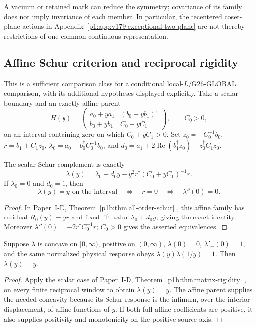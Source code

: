\documentclass[11pt,a4paper]{article}
\begin{document}
A vacuum or retained mark can reduce the symmetry; covariance of its
family does not imply invariance of each member.  In particular, the
recentered coset-plane actions in
Appendix~\ref{p1:app:v179-exceptional-two-plane} are not thereby
restrictions of one common continuous representation.


\subsection{Affine Schur criterion and reciprocal rigidity}
\label{p3f:app:v199-affine-schur}
This is a sufficient comparison class for a conditional local-\(L\)/G26-GLOBAL comparison, with its additional hypotheses
displayed explicitly.  Take a scalar boundary and an exactly affine parent
\[
 H(y)=\begin{pmatrix}a_0+ya_1&(b_0+yb_1)^\dagger\\
 b_0+yb_1&C_0+yC_1\end{pmatrix},\qquad C_0>0,
\]
on an interval containing zero on which \(C_0+yC_1>0\).
Set \(z_0=-C_0^{-1}b_0\), \(r=b_1+C_1z_0\),
\(\lambda_0=a_0-b_0^\dagger C_0^{-1}b_0\), and
\(d_0=a_1+2\operatorname{Re}(b_1^\dagger z_0)+z_0^\dagger C_1z_0\).

\begin{proposition}
\label{p3f:prop:v199-affine-schur-remainder}
The scalar Schur complement is exactly
\[
 \lambda(y)=\lambda_0+d_0y-y^2r^\dagger(C_0+yC_1)^{-1}r.
\]
If \(\lambda_0=0\) and \(d_0=1\), then
\[
 \lambda(y)=y\text{ on the interval}
 \quad\Longleftrightarrow\quad r=0
 \quad\Longleftrightarrow\quad \lambda''(0)=0.
\]
\end{proposition}
\begin{proof}
In Paper~I-D, Theorem~\ref{p1b:thm:all-order-schur}
\cite{Kugelmann2026Paper1D}, this affine family has residual
\(R_0(y)=yr\) and fixed-lift value \(\lambda_0+d_0y\), giving the
exact identity. Moreover \(\lambda''(0)=-2r^\dagger C_0^{-1}r\);
\(C_0>0\) gives the asserted equivalences.
\end{proof}

\begin{proposition}
\label{p3f:prop:v199-reciprocal-concavity}
Suppose \(\lambda\) is concave on \([0,\infty)\), positive on
\((0,\infty)\), \(\lambda(0)=0\), \(\lambda'_+(0)=1\), and the
same normalized physical response obeys
\(\lambda(y)\lambda(1/y)=1\).  Then \(\lambda(y)=y\).
\end{proposition}
\begin{proof}
Apply the scalar case of Paper~I-D,
Theorem~\ref{p1b:thm:matrix-rigidity} \cite{Kugelmann2026Paper1D},
on every finite reciprocal window to obtain \(\lambda(y)=y\).
The affine parent supplies the needed concavity because its Schur response
is the infimum, over the interior displacement, of affine functions of
\(y\). If both full affine coefficients are positive, it also supplies
positivity and monotonicity on the positive source axis.
\end{proof}
\end{document}
